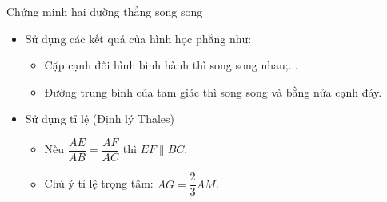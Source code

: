 \begin{dang}{Chứng minh hai đường thẳng song song}
\begin{itemize}
		\item [\ding{172}] Sử dụng các kết quả của hình học phẳng như:
		\begin{itemize}
			\item  Cặp cạnh đối hình bình hành thì song song nhau;...
			\item  Đường trung bình của tam giác thì song song và bằng nửa cạnh đáy.
		\end{itemize}
		\item [\ding{173}] Sử dụng tỉ lệ (Định lý Thales)
		\begin{itemize}
			\item Nếu $\dfrac{AE}{AB}=\dfrac{AF}{AC}$ thì $EF \parallel BC$.
			\item Chú ý tỉ lệ trọng tâm:  $AG=\dfrac{2}{3}AM$.
		\end{itemize}
\end{itemize}
\end{dang}

